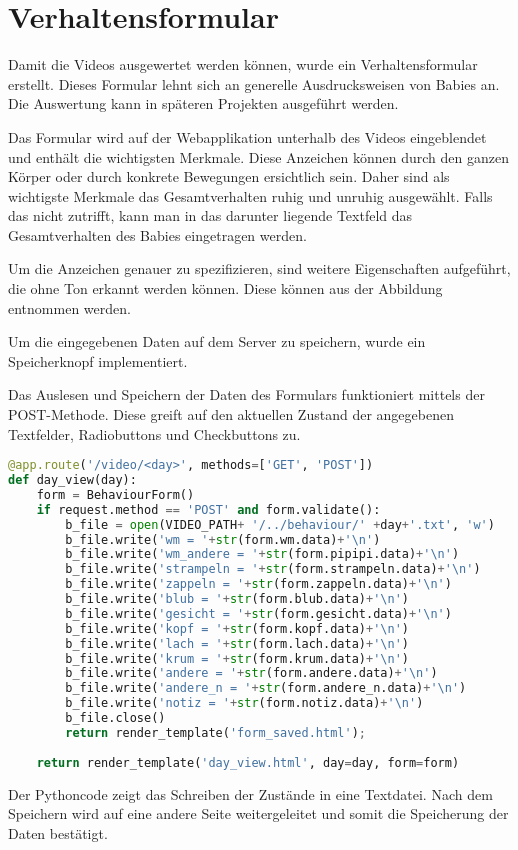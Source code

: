 \section{Verhaltensformular}
Damit die Videos ausgewertet werden können, wurde ein Verhaltensformular erstellt. Dieses Formular lehnt sich an generelle Ausdrucksweisen von Babies an.
Die Auswertung kann in späteren Projekten ausgeführt werden.

Das Formular wird auf der Webapplikation unterhalb des Videos eingeblendet und enthält die wichtigsten Merkmale. Diese Anzeichen können durch den ganzen Körper oder durch konkrete Bewegungen ersichtlich sein. Daher sind als \dq wichtigste Merkmale \dq das Gesamtverhalten \dq ruhig \dq und \dq unruhig \dq ausgewählt. Falls das nicht zutrifft, kann man in das darunter liegende Textfeld das Gesamtverhalten des Babies eingetragen werden.




Um die Anzeichen genauer zu spezifizieren, sind weitere Eigenschaften aufgeführt, die ohne Ton erkannt werden können. Diese können aus der Abbildung entnommen werden.


Um die eingegebenen Daten auf dem Server zu speichern, wurde ein Speicherknopf implementiert.


Das Auslesen und Speichern der Daten des Formulars funktioniert mittels der POST-Methode. Diese greift auf den aktuellen Zustand der angegebenen Textfelder, Radiobuttons und Checkbuttons zu.

\begin{lstlisting}[language=Python, caption=pygattlib: Receive notifications example, label=lst:pygattlib_ex]
@app.route('/video/<day>', methods=['GET', 'POST'])
def day_view(day):	
	form = BehaviourForm()
	if request.method == 'POST' and form.validate():
		b_file = open(VIDEO_PATH+ '/../behaviour/' +day+'.txt', 'w')
		b_file.write('wm = '+str(form.wm.data)+'\n')
		b_file.write('wm_andere = '+str(form.pipipi.data)+'\n')
		b_file.write('strampeln = '+str(form.strampeln.data)+'\n')
		b_file.write('zappeln = '+str(form.zappeln.data)+'\n')
		b_file.write('blub = '+str(form.blub.data)+'\n')
		b_file.write('gesicht = '+str(form.gesicht.data)+'\n')
		b_file.write('kopf = '+str(form.kopf.data)+'\n')
		b_file.write('lach = '+str(form.lach.data)+'\n')
		b_file.write('krum = '+str(form.krum.data)+'\n')
		b_file.write('andere = '+str(form.andere.data)+'\n')
		b_file.write('andere_n = '+str(form.andere_n.data)+'\n')
		b_file.write('notiz = '+str(form.notiz.data)+'\n')
		b_file.close()
		return render_template('form_saved.html');
		
	return render_template('day_view.html', day=day, form=form)
\end{lstlisting}

Der Pythoncode zeigt das Schreiben der Zustände in eine Textdatei. Nach dem Speichern wird auf eine andere Seite weitergeleitet und somit die Speicherung der Daten bestätigt.